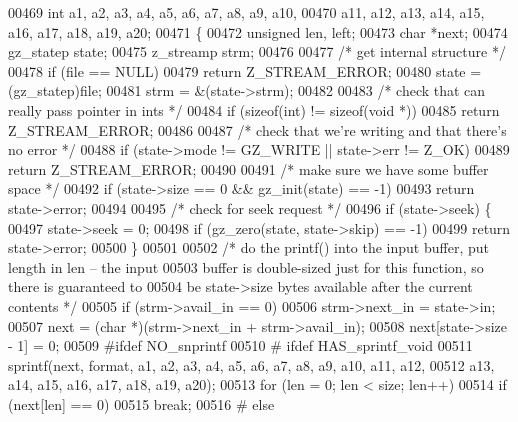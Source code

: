 \begin{DoxyCode}
00469     \textcolor{keywordtype}{int} a1, a2, a3, a4, a5, a6, a7, a8, a9, a10,
00470         a11, a12, a13, a14, a15, a16, a17, a18, a19, a20;
00471 \{
00472     \textcolor{keywordtype}{unsigned} len, left;
00473     \textcolor{keywordtype}{char} *next;
00474     gz\_statep state;
00475     z\_streamp strm;
00476 
00477     \textcolor{comment}{/* get internal structure */}
00478     \textcolor{keywordflow}{if} (file == NULL)
00479         \textcolor{keywordflow}{return} Z\_STREAM\_ERROR;
00480     state = (gz\_statep)file;
00481     strm = &(state->strm);
00482 
00483     \textcolor{comment}{/* check that can really pass pointer in ints */}
00484     \textcolor{keywordflow}{if} (\textcolor{keyword}{sizeof}(\textcolor{keywordtype}{int}) != \textcolor{keyword}{sizeof}(\textcolor{keywordtype}{void} *))
00485         \textcolor{keywordflow}{return} Z\_STREAM\_ERROR;
00486 
00487     \textcolor{comment}{/* check that we're writing and that there's no error */}
00488     \textcolor{keywordflow}{if} (state->mode != GZ\_WRITE || state->err != Z\_OK)
00489         \textcolor{keywordflow}{return} Z\_STREAM\_ERROR;
00490 
00491     \textcolor{comment}{/* make sure we have some buffer space */}
00492     \textcolor{keywordflow}{if} (state->size == 0 && gz\_init(state) == -1)
00493         \textcolor{keywordflow}{return} state->error;
00494 
00495     \textcolor{comment}{/* check for seek request */}
00496     if (state->seek) \{
00497         state->seek = 0;
00498         \textcolor{keywordflow}{if} (gz\_zero(state, state->skip) == -1)
00499             \textcolor{keywordflow}{return} state->error;
00500     \}
00501 
00502     \textcolor{comment}{/* do the printf() into the input buffer, put length in len -- the input}
00503 \textcolor{comment}{       buffer is double-sized just for this function, so there is guaranteed to}
00504 \textcolor{comment}{       be state->size bytes available after the current contents */}
00505     \textcolor{keywordflow}{if} (strm->avail\_in == 0)
00506         strm->next\_in = state->in;
00507     next = (\textcolor{keywordtype}{char} *)(strm->next\_in + strm->avail\_in);
00508     next[state->size - 1] = 0;
00509 \textcolor{preprocessor}{#ifdef NO\_snprintf}
00510 \textcolor{preprocessor}{#  ifdef HAS\_sprintf\_void}
00511     sprintf(next, format, a1, a2, a3, a4, a5, a6, a7, a8, a9, a10, a11, a12,
00512             a13, a14, a15, a16, a17, a18, a19, a20);
00513     \textcolor{keywordflow}{for} (len = 0; len < size; len++)
00514         \textcolor{keywordflow}{if} (next[len] == 0)
00515             \textcolor{keywordflow}{break};
00516 \textcolor{preprocessor}{#  else}

\end{DoxyCode}
